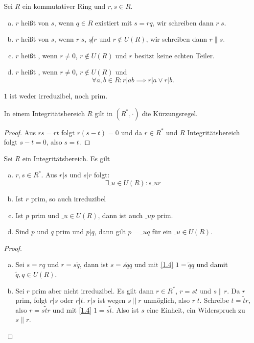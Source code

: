 \begin{df}
	Sei $R$ ein kommutativer Ring und $r, s \in R$.
	\begin{enumerate}[a)]
		\item
			$r$ heißt  von $s$, wenn $q \in R$ existiert mit $s = r q$, wir schreiben dann $r | s$.
		\item
			$r$ heißt  von $s$, wenn $r|s$, $s \not | r$ und $r \not\in U(R)$, wir schreiben dann $r \| s$.
		\item
			$r$ heißt , wenn $r \neq 0$, $r \not\in U(R)$ und $r$ besitzt keine echten Teiler.
		\item
			$r$ heißt , wenn $r \neq 0$, $r \not\in U(R)$ und
			\[
				\forall a,b \in R : r | ab \implies r | a \lor r | b.
			\]
	\end{enumerate}
	\begin{note}
		$1$ ist weder irreduzibel, noch prim.
	\end{note}
\end{df}

\begin{lem}
	In einem Integritätsbereich $R$ gilt in $(R^*, \cdot)$ die Kürzungsregel.
	\begin{proof}
		Aus $r s = r t$ folgt $r(s-t) = 0$ und da $r \in R^*$ und $R$ Integritätsbereich folgt $s-t = 0$, also $s = t$.
	\end{proof}
\end{lem}

\begin{lem}
	Sei $R$ ein Integritätsbereich. Es gilt
	\begin{enumerate}[a)]
		\item
			$r, s \in R^*$. Aus $r | s$ und $s | r$ folgt:
			\[
				\exists \_ u \in U(R) : s \_ u r
			\]
		\item
			Ist $r$ prim, so auch irreduzibel
		\item
			Ist $p$ prim und $\_ u \in U(R)$, dann ist auch $\_ u p$ prim.
		\item
			Sind $p$ und $q$ prim und $p | q$, dann gilt $p = \_ u q$ für ein $\_ u \in U(R)$.
	\end{enumerate}
	\begin{proof}
		\begin{enumerate}[a)]
			\item
				Sei $s = rq$ und $r = s\tilde q$, dann ist $s = s \tilde q q$ und mit \ref{1.4} $1 = \tilde q q$ und damit $\tilde q, q \in U(R)$.
			\item
				Sei $r$ prim aber nicht irreduzibel.
				Es gilt dann $r \in R^*$, $r = st$ und $s \| r$.
				Da $r$ prim, folgt $r | s$ oder $r | t$.
				$r | s$ ist wegen $s \| r$ unmöglich, also $r | t$.
				Schreibe $t = \tilde t r$, also $r = s \tilde t r$ und mit \ref{1.4} $1 = s \tilde t$.
				Also ist $s$ eine Einheit, ein Widerspruch zu $s \| r$.
		\end{enumerate}
	\end{proof}
\end{lem}


